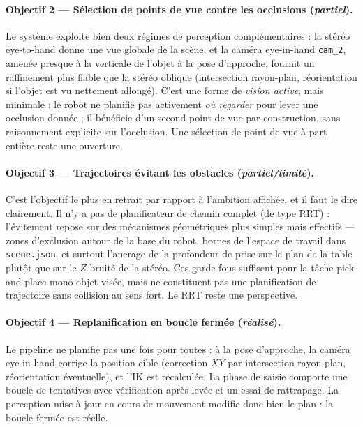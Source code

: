 \paragraph{Objectif 2 --- Sélection de points de vue contre les occlusions
(\emph{partiel}).} Le système exploite bien deux régimes de perception
complémentaires : la stéréo eye-to-hand donne une vue globale de la scène, et la
caméra eye-in-hand \texttt{cam\_2}, amenée presque à la verticale de l'objet à
la pose d'approche, fournit un raffinement plus fiable que la stéréo oblique
(intersection rayon-plan, réorientation si l'objet est vu nettement allongé).
C'est une forme de \emph{vision active}, mais minimale : le robot ne planifie
pas activement \emph{où regarder} pour lever une occlusion donnée ; il bénéficie
d'un second point de vue par construction, sans raisonnement explicite sur
l'occlusion. Une sélection de point de vue à part entière reste une ouverture.

\paragraph{Objectif 3 --- Trajectoires évitant les obstacles
(\emph{partiel/limité}).} C'est l'objectif le plus en retrait par rapport à
l'ambition affichée, et il faut le dire clairement. Il n'y a pas de planificateur
de chemin complet (de type RRT) : l'évitement repose sur des mécanismes
géométriques plus simples mais effectifs --- zones d'exclusion autour de la base
du robot, bornes de l'espace de travail dans \texttt{scene.json}, et surtout
l'ancrage de la profondeur de prise sur le plan de la table plutôt que sur le $Z$
bruité de la stéréo. Ces garde-fous suffisent pour la tâche pick-and-place
mono-objet visée, mais ne constituent pas une planification de trajectoire sans
collision au sens fort. Le RRT reste une perspective.

\paragraph{Objectif 4 --- Replanification en boucle fermée
(\emph{réalisé}).} Le pipeline ne planifie pas une fois pour toutes : à la pose
d'approche, la caméra eye-in-hand corrige la position cible (correction
$XY$ par intersection rayon-plan, réorientation éventuelle), et l'IK est
recalculée. La phase de saisie comporte une boucle de tentatives avec
vérification après levée et un essai de rattrapage. La perception mise à jour en
cours de mouvement modifie donc bien le plan : la boucle fermée est réelle.

